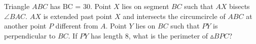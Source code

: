Triangle $ABC$ has BC = $30$. Point $X$ lies on segment $BC$ such that $AX$ bisects $\angle BAC$. $AX$ is extended past point $X$ and intersects the circumcircle of $ABC$ at another point $P$ different from $A$. Point $Y$ lies on $BC$ such that $PY$ is perpendicular to $BC$. If $PY$ has length $8$, what is the perimeter of  $\vartriangle BPC$?
